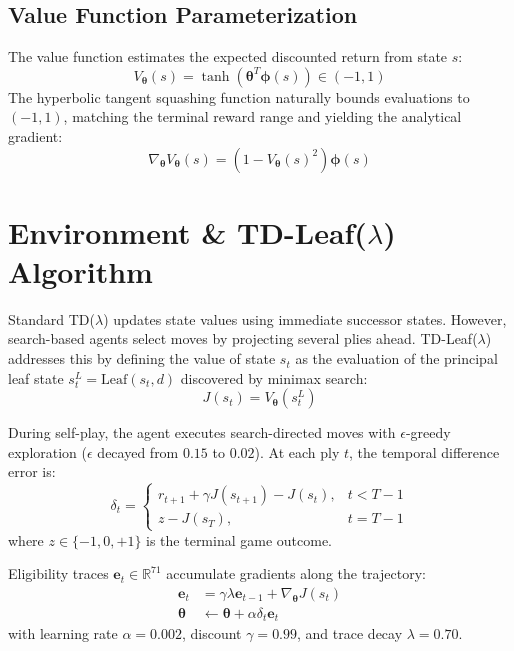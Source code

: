 \documentclass[conference,10pt,twocolumn]{IEEEtran}
\begin{document}
\subsection{Value Function Parameterization}
The value function estimates the expected discounted return from state $s$:
\begin{equation}
V_{\boldsymbol{\theta}}(s) = \tanh\left( \boldsymbol{\theta}^T \boldsymbol{\phi}(s) \right) \in (-1, 1)
\end{equation}
The hyperbolic tangent squashing function naturally bounds evaluations to $(-1, 1)$, matching the terminal reward range and yielding the analytical gradient:
\begin{equation}
\nabla_{\boldsymbol{\theta}} V_{\boldsymbol{\theta}}(s) = \left( 1 - V_{\boldsymbol{\theta}}(s)^2 \right) \boldsymbol{\phi}(s)
\end{equation}

\section{Environment \& TD-Leaf($\lambda$) Algorithm}
Standard TD($\lambda$) updates state values using immediate successor states. However, search-based agents select moves by projecting several plies ahead. TD-Leaf($\lambda$) \cite{baxter1998} addresses this by defining the value of state $s_t$ as the evaluation of the principal leaf state $s_t^L = \text{Leaf}(s_t, d)$ discovered by minimax search:
\begin{equation}
J(s_t) = V_{\boldsymbol{\theta}}(s_t^L)
\end{equation}

During self-play, the agent executes search-directed moves with $\epsilon$-greedy exploration ($\epsilon$ decayed from $0.15$ to $0.02$). At each ply $t$, the temporal difference error is:
\begin{equation}
\delta_t = \begin{cases}
r_{t+1} + \gamma J(s_{t+1}) - J(s_t), & t < T - 1 \\
z - J(s_T), & t = T - 1
\end{cases}
\end{equation}
where $z \in \{-1, 0, +1\}$ is the terminal game outcome.

Eligibility traces $\mathbf{e}_t \in \mathbb{R}^{71}$ accumulate gradients along the trajectory:
\begin{align}
\mathbf{e}_t &= \gamma \lambda \mathbf{e}_{t-1} + \nabla_{\boldsymbol{\theta}} J(s_t) \\
\boldsymbol{\theta} &\leftarrow \boldsymbol{\theta} + \alpha \delta_t \mathbf{e}_t
\end{align}
with learning rate $\alpha = 0.002$, discount $\gamma = 0.99$, and trace decay $\lambda = 0.70$.
\end{document}
